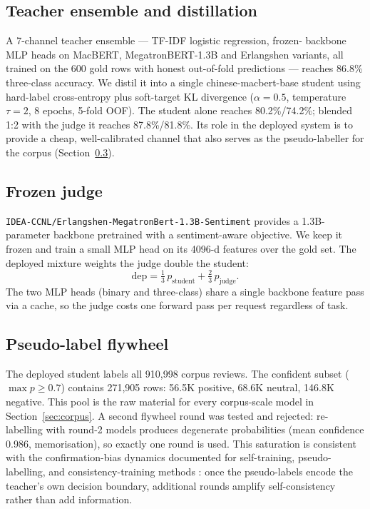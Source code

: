 \documentclass[11pt,a4paper]{article}
\newcommand{\code}[1]{\texttt{#1}}
\begin{document}
\subsection{Teacher ensemble and distillation}
\label{sec:distill}

A 7-channel teacher ensemble --- TF-IDF logistic regression, frozen-
backbone MLP heads on MacBERT, MegatronBERT-1.3B and Erlangshen
variants, all trained on the 600 gold rows with honest out-of-fold
predictions --- reaches 86.8\% three-class accuracy. We distil it into
a single chinese-macbert-base student using hard-label
cross-entropy plus soft-target KL divergence
($\alpha=0.5$, temperature $\tau=2$, 8 epochs, 5-fold OOF). The student
alone reaches 80.2\%/74.2\%; blended 1:2 with the judge it reaches
87.8\%/81.8\%. Its role in the deployed system is to provide a cheap,
well-calibrated channel that also serves as the pseudo-labeller for
the corpus (Section~\ref{sec:flywheel}).

\subsection{Frozen judge}
\label{sec:judge}

\code{IDEA-CCNL/Erlangshen-}\hspace{0pt}\code{MegatronBert-1.3B-Sentiment} provides a
1.3B-parameter backbone pretrained with a sentiment-aware objective. We
keep it frozen and train a small MLP head on its 4096-d features over
the gold set. The deployed mixture weights the judge double the
student:
\[
  \mathrm{dep} = \tfrac{1}{3}\,p_{\text{student}} +
                \tfrac{2}{3}\,p_{\text{judge}} .
\]
The two MLP heads (binary and three-class) share a single backbone
feature pass via a cache, so the judge costs one forward pass per
request regardless of task.

\subsection{Pseudo-label flywheel}
\label{sec:flywheel}

The deployed student labels all 910{,}998 corpus reviews. The confident
subset ($\max p \ge 0.7$) contains 271{,}905 rows: 56.5K positive,
68.6K neutral, 146.8K negative. This pool is the raw material for every
corpus-scale model in Section~\ref{sec:corpus}. A second flywheel round
was tested and rejected: re-labelling with round-2 models produces
degenerate probabilities (mean confidence 0.986, memorisation), so
exactly one round is used. This saturation is consistent with the
confirmation-bias dynamics documented for self-training,
pseudo-labelling, and consistency-training methods
\citep{arazo2020,xie2020,xie2020uda,sohn2020}: once the pseudo-labels
encode the teacher's own decision boundary, additional rounds amplify
self-consistency rather than add information.
\end{document}
